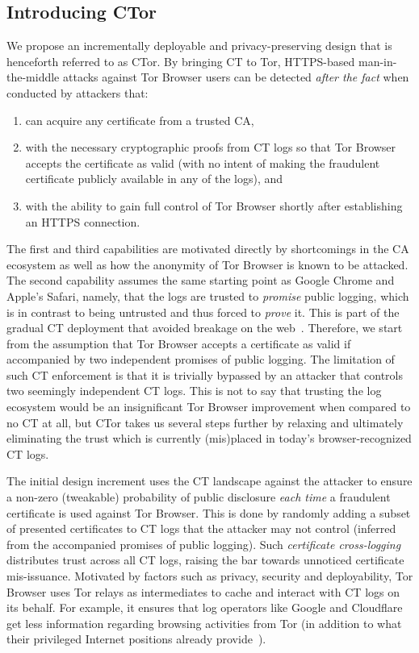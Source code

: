 \subsection{Introducing CTor}
We propose an incrementally deployable and privacy-preserving design that is
henceforth referred to as CTor.  By bringing CT to Tor, HTTPS-based
man-in-the-middle attacks against Tor Browser users can be detected \emph{after
the fact} when conducted by attackers that:
\begin{enumerate}
	\item can acquire any certificate from a trusted CA,
	\item with the necessary cryptographic proofs from CT logs so that
		Tor Browser accepts the certificate as valid (with no intent of making
		the fraudulent certificate publicly available in any of the logs), and
	\item with the ability to gain full control of Tor Browser shortly after
		establishing an HTTPS connection.
\end{enumerate}

The first and third capabilities are motivated directly by shortcomings in the
CA ecosystem as well as how the anonymity of Tor Browser is known to be
attacked.  The second capability assumes the same starting point as Google
Chrome and Apple's Safari, namely, that the logs are trusted to \emph{promise}
public logging, which is in contrast to being untrusted and thus forced to
\emph{prove} it.  This is part of the gradual CT deployment that avoided
breakage on the web~\cite{does-ct-break-the-web}.  Therefore, we start
from the assumption that Tor Browser accepts a certificate as valid if 
accompanied by two independent promises of public logging.  The limitation of
such CT enforcement is that it is trivially bypassed by an attacker that
controls two seemingly independent CT logs.  This is not to say that trusting
the log ecosystem would be an insignificant Tor Browser improvement when
compared to no CT at all, but CTor takes us several steps further by relaxing
and ultimately eliminating the trust which is currently (mis)placed in today's
browser-recognized CT logs.

The initial design increment uses the CT landscape against the attacker to
ensure a non-zero (tweakable) probability of public disclosure \emph{each time}
a fraudulent certificate is used against Tor Browser.  This is done by randomly
adding a subset of presented certificates to CT logs that the attacker may not
control (inferred from the accompanied promises of public logging).  Such
\emph{certificate cross-logging} distributes trust across all CT logs, raising
the bar towards unnoticed certificate mis-issuance.  Motivated by factors such
as privacy, security and deployability, Tor Browser uses Tor relays as
intermediates to cache and interact with CT logs on its behalf.  For example, it
ensures that log operators like Google and Cloudflare get less information
regarding browsing activities from Tor (in addition to what their privileged
Internet positions already provide~\cite{1mtrack,TorDNS}).

